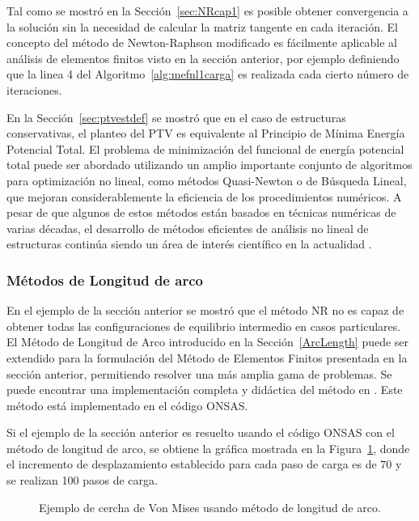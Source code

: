 Tal como se mostró en la Sección~\ref{sec:NRcap1} es posible obtener convergencia a la solución sin la necesidad de calcular la matriz tangente en cada iteración. %
%
El concepto del método de Newton-Raphson modificado es fácilmente aplicable al análisis de elementos finitos visto en la sección anterior, por ejemplo definiendo que la linea 4 del Algoritmo~\ref{alg:mefnl1carga} es realizada cada cierto número de iteraciones. %

En la Sección~\ref{sec:ptvestdef} se mostró que en el caso de estructuras conservativas, el planteo del PTV es equivalente al Principio de Mínima Energía Potencial Total. %
%
El problema de minimización del funcional de energía potencial total puede ser abordado utilizando un amplio importante conjunto de algoritmos para optimización no lineal, como métodos Quasi-Newton o de Búsqueda Lineal, que mejoran considerablemente la eficiencia de los procedimientos numéricos. %
%
A pesar de que algunos de estos métodos están basados en técnicas numéricas de varias décadas, el desarrollo de métodos eficientes de análisis no lineal de estructuras continúa siendo un área de interés científico en la actualidad \citep{Magisano2017}.


\subsubsection{Métodos de Longitud de arco}

En el ejemplo de la sección anterior se mostró que el método NR no es capaz de obtener todas las configuraciones de equilibrio intermedio en casos particulares. %
%
El Método de Longitud de Arco introducido en la Sección~\ref{ArcLength} puede ser extendido para la formulación del Método de Elementos Finitos presentada en la sección anterior, permitiendo resolver una más amplia gama de problemas. %
%
Se puede encontrar una implementación completa y didáctica del método en \citep{DeSouzaNeto2008}. %
%
Este método está implementado en el código ONSAS. %

Si el ejemplo de la sección anterior es resuelto usando el código ONSAS con el método de longitud de arco, se obtiene la gráfica mostrada en la Figura~\ref{fig:misesarclen}, donde el incremento de desplazamiento establecido para cada paso de carga es de $70$ y se realizan 100 pasos de carga.
%
\begin{figure}[htb]
	\centering
	\resizebox{.45\linewidth}{!}{}
	\resizebox{.45\linewidth}{!}{}
	\caption{Ejemplo de cercha de Von Mises usando método de longitud de arco.}
	\label{fig:misesarclen}
\end{figure}

